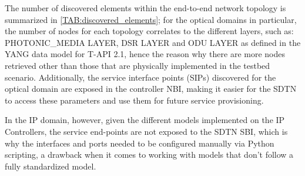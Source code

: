\documentclass[a4paper,fleqn]{cas-dc}
\begin{document}
The number of discovered elements within the end-to-end network topology is summarized in \cref{TAB:discovered_elements}; for the optical domains in particular, the number of nodes for each topology correlates to the different layers, such as:
PHOTONIC\_MEDIA LAYER, DSR LAYER and ODU LAYER as defined in the YANG data model for T-API 2.1, hence the reason why there are more nodes retrieved other than those that are physically implemented in the testbed scenario. Additionally, the service interface points (SIPs) discovered for the optical domain are exposed in the controller NBI, making it easier for the SDTN to access these parameters and use them for future service provisioning. 

In the IP domain, however, given the different models implemented on the IP Controllers, the service end-points are not exposed to the SDTN SBI, which is why the interfaces and ports needed to be configured manually via Python scripting, a drawback when it comes to working with models that don’t follow a fully standardized model.
\end{document}
